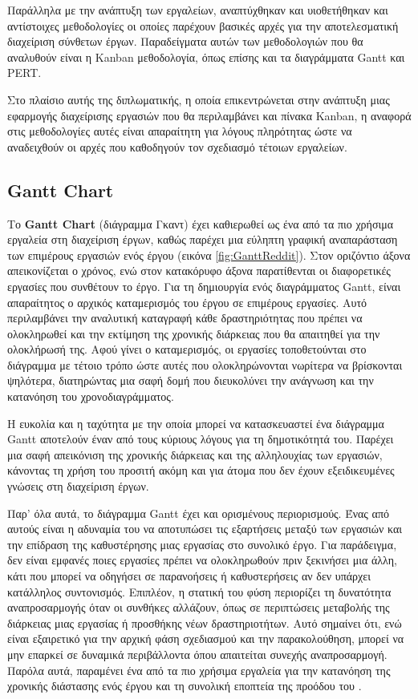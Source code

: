         Παράλληλα με την ανάπτυξη των εργαλείων, αναπτύχθηκαν και υιοθετήθηκαν και αντίστοιχες μεθοδολογίες οι οποίες παρέχουν βασικές αρχές για την αποτελεσματική διαχείριση σύνθετων έργων. Παραδείγματα αυτών των μεθοδολογιών που θα αναλυθούν είναι η Kanban μεθοδολογία, όπως επίσης και τα διαγράμματα Gantt και PERT.

        Στο πλαίσιο αυτής της διπλωματικής, η οποία επικεντρώνεται στην ανάπτυξη μιας εφαρμογής διαχείρισης εργασιών που θα περιλαμβάνει και πίνακα Kanban, η αναφορά στις μεθοδολογίες αυτές είναι απαραίτητη για λόγους πληρότητας ώστε να αναδειχθούν οι αρχές που καθοδηγούν τον σχεδιασμό τέτοιων εργαλείων.

        \subsection{Gantt Chart}
            Το \textbf{Gantt Chart} (διάγραμμα Γκαντ) έχει καθιερωθεί ως ένα από τα πιο χρήσιμα εργαλεία στη διαχείριση έργων, καθώς παρέχει μια εύληπτη γραφική αναπαράσταση των επιμέρους εργασιών ενός έργου (εικόνα \ref{fig:GanttReddit}). Στον οριζόντιο άξονα απεικονίζεται ο χρόνος, ενώ στον κατακόρυφο άξονα παρατίθενται οι διαφορετικές εργασίες που συνθέτουν το έργο.  Για τη δημιουργία ενός διαγράμματος Gantt, είναι απαραίτητος ο αρχικός καταμερισμός του έργου σε επιμέρους εργασίες. Αυτό περιλαμβάνει την αναλυτική καταγραφή κάθε δραστηριότητας που πρέπει να ολοκληρωθεί και την εκτίμηση της χρονικής διάρκειας που θα απαιτηθεί για την ολοκλήρωσή της. Αφού γίνει ο καταμερισμός, οι εργασίες τοποθετούνται στο διάγραμμα με τέτοιο τρόπο ώστε αυτές που ολοκληρώνονται νωρίτερα να βρίσκονται ψηλότερα, διατηρώντας μια σαφή δομή που διευκολύνει την ανάγνωση και την κατανόηση του χρονοδιαγράμματος.

            Η ευκολία και η ταχύτητα με την οποία μπορεί να κατασκευαστεί ένα διάγραμμα Gantt αποτελούν έναν από τους κύριους λόγους για τη δημοτικότητά του. Παρέχει μια σαφή απεικόνιση της χρονικής διάρκειας και της αλληλουχίας των εργασιών, κάνοντας τη χρήση του προσιτή ακόμη και για άτομα που δεν έχουν εξειδικευμένες γνώσεις στη διαχείριση έργων.

            Παρ' όλα αυτά, το διάγραμμα Gantt έχει και ορισμένους περιορισμούς. Ένας από αυτούς είναι η αδυναμία του να αποτυπώσει τις εξαρτήσεις μεταξύ των εργασιών και την επίδραση της καθυστέρησης μιας εργασίας στο συνολικό έργο. Για παράδειγμα, δεν είναι εμφανές ποιες εργασίες πρέπει να ολοκληρωθούν πριν ξεκινήσει μια άλλη, κάτι που μπορεί να οδηγήσει σε παρανοήσεις ή καθυστερήσεις αν δεν υπάρχει κατάλληλος συντονισμός. Επιπλέον, η στατική του φύση περιορίζει τη δυνατότητα αναπροσαρμογής όταν οι συνθήκες αλλάζουν, όπως σε περιπτώσεις μεταβολής της διάρκειας μιας εργασίας ή προσθήκης νέων δραστηριοτήτων. Αυτό σημαίνει ότι, ενώ είναι εξαιρετικό για την αρχική φάση σχεδιασμού και την παρακολούθηση, μπορεί να μην επαρκεί σε δυναμικά περιβάλλοντα όπου απαιτείται συνεχής αναπροσαρμογή. Παρόλα αυτά, παραμένει ένα από τα πιο χρήσιμα εργαλεία για την κατανόηση της χρονικής διάστασης ενός έργου και τη συνολική εποπτεία της προόδου του \cite{Xenos}.

